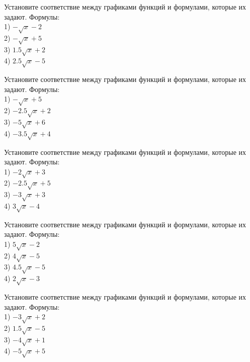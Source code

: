 \documentclass[4apaper]{article}
\begin{document}
\begin{taskBN}{11}
Установите соответствие между графиками функций и формулами, которые их задают. Формулы: \\1) $-\sqrt{x}-2$\\2) $-\sqrt{x}+5$\\3) $1.5\sqrt{x}+2$\\4) $2.5\sqrt{x}-5$
\end{taskBN}

\begin{taskBN}{12}
Установите соответствие между графиками функций и формулами, которые их задают. Формулы: \\1) $-\sqrt{x}+5$\\2) $-2.5\sqrt{x}+2$\\3) $-5\sqrt{x}+6$\\4) $-3.5\sqrt{x}+4$
\end{taskBN}

\begin{taskBN}{13}
Установите соответствие между графиками функций и формулами, которые их задают. Формулы: \\1) $-2\sqrt{x}+3$\\2) $-2.5\sqrt{x}+5$\\3) $-3\sqrt{x}+3$\\4) $3\sqrt{x}-4$
\end{taskBN}

\begin{taskBN}{14}
Установите соответствие между графиками функций и формулами, которые их задают. Формулы: \\1) $5\sqrt{x}-2$\\2) $4\sqrt{x}-5$\\3) $4.5\sqrt{x}-5$\\4) $2\sqrt{x}-3$
\end{taskBN}

\begin{taskBN}{15}
Установите соответствие между графиками функций и формулами, которые их задают. Формулы: \\1) $-3\sqrt{x}+2$\\2) $1.5\sqrt{x}-5$\\3) $-4\sqrt{x}+1$\\4) $-5\sqrt{x}+5$
\end{taskBN}
\end{document}
